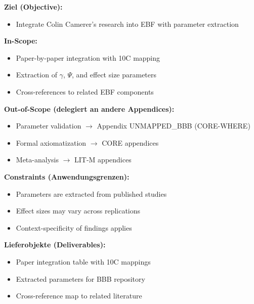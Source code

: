 
\begin{tcolorbox}[
    colback=orange!5!white,
    colframe=orange!75!black,
    title={\textbf{Appendix Scope: Ziel / In-Scope / Out-of-Scope / Constraints}},
    fonttitle=\bfseries
]

\textbf{Ziel (Objective):}
\begin{itemize}[nosep]
    \item Integrate Colin Camerer's research into EBF with parameter extraction
\end{itemize}

\textbf{In-Scope:}
\begin{itemize}[nosep]
    \item Paper-by-paper integration with 10C mapping
    \item Extraction of $\gamma$, $\Psi$, and effect size parameters
    \item Cross-references to related EBF components
\end{itemize}

\textbf{Out-of-Scope (delegiert an andere Appendices):}
\begin{itemize}[nosep]
    \item Parameter validation $\rightarrow$ Appendix UNMAPPED_BBB (CORE-WHERE)
    \item Formal axiomatization $\rightarrow$ CORE appendices
    \item Meta-analysis $\rightarrow$ LIT-M appendices
\end{itemize}

\textbf{Constraints (Anwendungsgrenzen):}
\begin{itemize}[nosep]
    \item Parameters are extracted from published studies
    \item Effect sizes may vary across replications
    \item Context-specificity of findings applies
\end{itemize}

\textbf{Lieferobjekte (Deliverables):}
\begin{itemize}[nosep]
    \item Paper integration table with 10C mappings
    \item Extracted parameters for BBB repository
    \item Cross-reference map to related literature
\end{itemize}

\end{tcolorbox}

